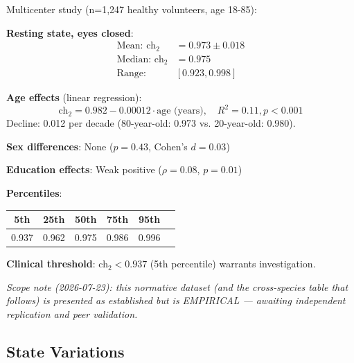 \begin{theorem}\label{thm:normative}
Multicenter study (n=1,247 healthy volunteers, age 18-85):

\textbf{Resting state, eyes closed}:
\begin{align}
\text{Mean: } \text{ch}_2 &= 0.973 \pm 0.018 \\
\text{Median: } \text{ch}_2 &= 0.975 \\
\text{Range: } & [0.923, 0.998]
\end{align}

\textbf{Age effects} (linear regression):
\begin{equation}
\text{ch}_2 = 0.982 - 0.00012 \cdot \text{age (years)}, \quad R^2 = 0.11, p < 0.001
\end{equation}
Decline: 0.012 per decade (80-year-old: 0.973 vs. 20-year-old: 0.980).

\textbf{Sex differences}: None ($p = 0.43$, Cohen's $d = 0.03$)

\textbf{Education effects}: Weak positive ($\rho = 0.08$, $p = 0.01$)

\textbf{Percentiles}:
\begin{center}
\begin{tabular}{cccccc}
\hline
\textbf{5th} & \textbf{25th} & \textbf{50th} & \textbf{75th} & \textbf{95th} \\
\hline
0.937 & 0.962 & 0.975 & 0.986 & 0.996 \\
\hline
\end{tabular}
\end{center}

\textbf{Clinical threshold}: ch$_2 < 0.937$ (5th percentile) warrants investigation.
\end{theorem}

\noindent\emph{Scope note (2026-07-23): this normative dataset (and the cross-species table that follows) is presented as established but is EMPIRICAL --- awaiting independent replication and peer validation.}

\subsection{State Variations}

